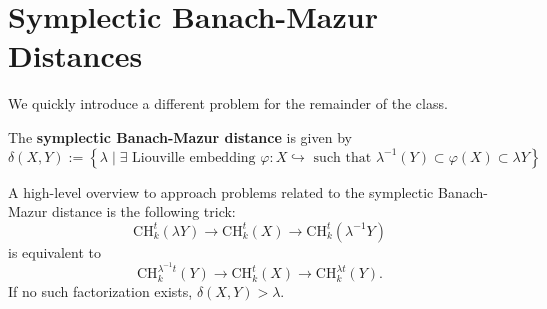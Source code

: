 \section{Symplectic Banach-Mazur Distances}

We quickly introduce a different problem for the remainder of the class.

\begin{definition}

The \textbf{symplectic Banach-Mazur distance} is given by
\[
\delta(X,Y) := \left \{\lambda \mid \exists \text{ Liouville embedding }\varphi: X\hookrightarrow \text{ such that }\lambda^{-1}(Y) \subset \varphi(X) \subset \lambda Y\right\}
\]

\end{definition}

A high-level overview to approach problems related to the symplectic Banach-Mazur distance is the following trick:
\[
\text{CH}_k^t(\lambda Y) \to \text{CH}_k^t(X) \to \text{CH}_k^t \left(\lambda^{-1}Y \right)
\]
is equivalent to
\[
\text{CH}_k^{\lambda^{-1}t}(Y) \to \text{CH}_k^t(X) \to \text{CH}_k^{\lambda t} \left(Y \right).
\]
If no such factorization exists, $\delta(X,Y) >\lambda$.